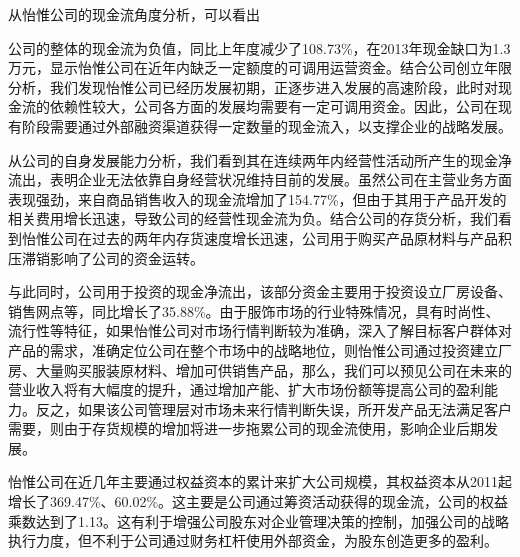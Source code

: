 从怡惟公司的现金流角度分析，可以看出
\begin{compactenum}[(1) ]
\item 公司的整体的现金流为负值，同比上年度减少了108.73\%，在2013年现金缺口为1.3万元，显示怡惟公司在近年内缺乏一定额度的可调用运营资金。结合公司创立年限分析，我们发现怡惟公司已经历发展初期，正逐步进入发展的高速阶段，此时对现金流的依赖性较大，公司各方面的发展均需要有一定可调用资金。因此，公司在现有阶段需要通过外部融资渠道获得一定数量的现金流入，以支撑企业的战略发展。
\item 从公司的自身发展能力分析，我们看到其在连续两年内经营性活动所产生的现金净流出，表明企业无法依靠自身经营状况维持目前的发展。虽然公司在主营业务方面表现强劲，来自商品销售收入的现金流增加了154.77\%，但由于其用于产品开发的相关费用增长迅速，导致公司的经营性现金流为负。结合公司的存货分析，我们看到怡惟公司在过去的两年内存货速度增长迅速，公司用于购买产品原材料与产品积压滞销影响了公司的资金运转。
\item  与此同时，公司用于投资的现金净流出，该部分资金主要用于投资设立厂房设备、销售网点等，同比增长了35.88\%。由于服饰市场的行业特殊情况，具有时尚性、流行性等特征，如果怡惟公司对市场行情判断较为准确，深入了解目标客户群体对产品的需求，准确定位公司在整个市场中的战略地位，则怡惟公司通过投资建立厂房、大量购买服装原材料、增加可供销售产品，那么，我们可以预见公司在未来的营业收入将有大幅度的提升，通过增加产能、扩大市场份额等提高公司的盈利能力。反之，如果该公司管理层对市场未来行情判断失误，所开发产品无法满足客户需要，则由于存货规模的增加将进一步拖累公司的现金流使用，影响企业后期发展。
\item 怡惟公司在近几年主要通过权益资本的累计来扩大公司规模，其权益资本从2011起增长了369.47\%、60.02\%。这主要是公司通过筹资活动获得的现金流，公司的权益乘数达到了1.13。这有利于增强公司股东对企业管理决策的控制，加强公司的战略执行力度，但不利于公司通过财务杠杆使用外部资金，为股东创造更多的盈利。
\end{compactenum}

